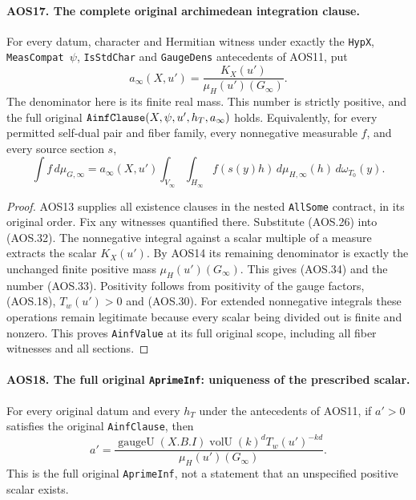 \documentclass[11pt,a4paper]{article}
\numberwithin{equation}{section}
\theoremstyle{remark}\newtheorem{remark}[theorem]{Remark}
\begin{document}
\paragraph{AOS17. The complete original archimedean integration clause.}
\label{claim:AOS17}
For every datum, character and Hermitian witness under exactly the
\texttt{Hyp\allowbreak X}, \texttt{Meas\allowbreak Compat\,$\psi$}, \texttt{Is\allowbreak Std\allowbreak Char}
and \texttt{Gauge\allowbreak Dens} antecedents of AOS11, put
\[
             a_\infty(X,u')
                 =\frac{K_X(u')}{\mu_H(u')(G_\infty)}.
 \tag{AOS.33}
\]
The denominator here is its finite real mass.  This number is
strictly positive, and the full original
$\texttt{Ainf\allowbreak Clause}(X,\psi,u',h_T,a_\infty)$ holds.  Equivalently,
for every permitted self-dual pair and fiber family, every
nonnegative measurable $f$, and every source section $s$,
\[
       \int f\,d\mu_{G,\infty}
          =a_\infty(X,u')
             \int_{V_\infty}\int_{H_\infty}
                    f(s(y)h)\,d\mu_{H,\infty}(h)\,d\omega_{T_0}(y).
 \tag{AOS.34}
\]

\begin{proof}
AOS13 supplies all existence clauses in the nested \texttt{All\allowbreak Some}
contract, in its original order.  Fix any witnesses quantified
there.  Substitute (AOS.26) into (AOS.32).  The nonnegative
integral against a scalar multiple of a measure extracts the
scalar $K_X(u')$.  By AOS14 its remaining denominator is exactly
the unchanged finite positive mass $\mu_H(u')(G_\infty)$.
This gives (AOS.34) and the number (AOS.33).  Positivity follows
from positivity of the gauge factors, (AOS.18), $T_w(u')>0$ and
(AOS.30).  For extended nonnegative integrals these operations
remain legitimate because every scalar being divided out is finite
and nonzero.  This proves \texttt{Ainf\allowbreak Value} at its full original
scope, including all fiber witnesses and all sections.
\end{proof}

\paragraph{AOS18. The full original \texttt{Aprime\allowbreak Inf}: uniqueness of the prescribed scalar.}
\label{claim:AOS18}
For every original datum and every $h_T$ under the antecedents of
AOS11, if $a'>0$ satisfies the original \texttt{Ainf\allowbreak Clause}, then
\[
       a'=\frac{\operatorname{gaugeU}(X.B.I)
                         \operatorname{volU}(k)^dT_w(u')^{-kd}}
                        {\mu_H(u')(G_\infty)}.
 \tag{AOS.35}
\]
This is the full original \texttt{Aprime\allowbreak Inf}, not a statement that
an unspecified positive scalar exists.
\end{document}
